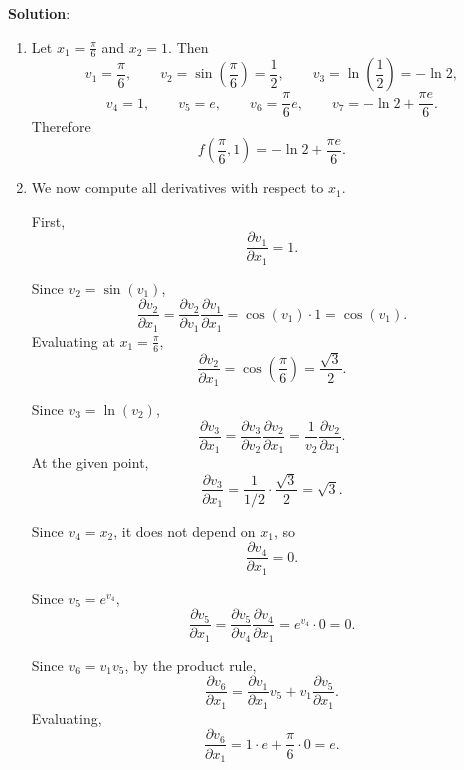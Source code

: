 \documentclass[submit]{harvardml}
\newenvironment{solution}{
    \vspace{2mm}
    \color{blue}\noindent\textbf{Solution}:
}{}
\begin{document}
\begin{solution}
\begin{enumerate}
    \begin{enumerate}
        \item Let $x_1 = \frac{\pi}{6}$ and $x_2 = 1$. Then
        \[
        v_1 = \frac{\pi}{6},
        \qquad
        v_2 = \sin\left(\frac{\pi}{6}\right) = \frac{1}{2},
        \qquad
        v_3 = \ln\left(\frac{1}{2}\right) = -\ln 2,
        \]
        \[
        v_4 = 1,
        \qquad
        v_5 = e,
        \qquad
        v_6 = \frac{\pi}{6}e,
        \qquad
        v_7 = -\ln 2 + \frac{\pi e}{6}.
        \]
        Therefore
        \[
        f\left(\frac{\pi}{6},1\right)= -\ln 2 + \frac{\pi e}{6}.
        \]

        \item We now compute all derivatives with respect to $x_1$.

        First,
        \[
        \frac{\partial v_1}{\partial x_1} = 1.
        \]

        Since $v_2 = \sin(v_1)$,
        \[
        \frac{\partial v_2}{\partial x_1}
        =
        \frac{\partial v_2}{\partial v_1}
        \frac{\partial v_1}{\partial x_1}
        =
        \cos(v_1)\cdot 1
        =
        \cos(v_1).
        \]
        Evaluating at $x_1=\frac{\pi}{6}$,
        \[
        \frac{\partial v_2}{\partial x_1}
        =
        \cos\left(\frac{\pi}{6}\right)
        =
        \frac{\sqrt{3}}{2}.
        \]

        Since $v_3 = \ln(v_2)$,
        \[
        \frac{\partial v_3}{\partial x_1}
        =
        \frac{\partial v_3}{\partial v_2}
        \frac{\partial v_2}{\partial x_1}
        =
        \frac{1}{v_2}\frac{\partial v_2}{\partial x_1}.
        \]
        At the given point,
        \[
        \frac{\partial v_3}{\partial x_1}
        =
        \frac{1}{1/2}\cdot \frac{\sqrt{3}}{2}
        =
        \sqrt{3}.
        \]

        Since $v_4 = x_2$, it does not depend on $x_1$, so
        \[
        \frac{\partial v_4}{\partial x_1} = 0.
        \]

        Since $v_5 = e^{v_4}$,
        \[
        \frac{\partial v_5}{\partial x_1}
        =
        \frac{\partial v_5}{\partial v_4}
        \frac{\partial v_4}{\partial x_1}
        =
        e^{v_4}\cdot 0 = 0.
        \]

        Since $v_6 = v_1 v_5$, by the product rule,
        \[
        \frac{\partial v_6}{\partial x_1}
        =
        \frac{\partial v_1}{\partial x_1}v_5 + v_1\frac{\partial v_5}{\partial x_1}.
        \]
        Evaluating,
        \[
        \frac{\partial v_6}{\partial x_1}
        =
        1\cdot e + \frac{\pi}{6}\cdot 0
        =
        e.
        \]


\end{enumerate}
\end{enumerate}
\end{solution}
\end{document}
